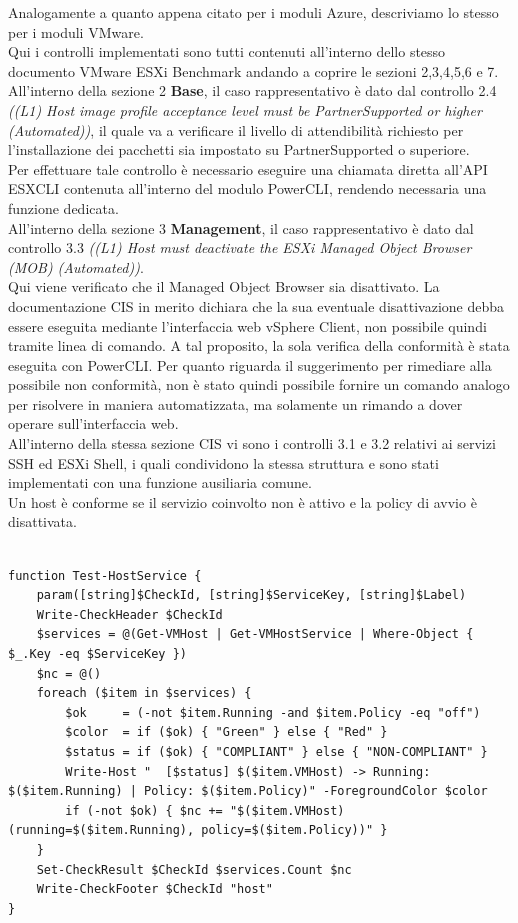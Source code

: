 \documentclass[a4paper,11pt]{report}
\begin{document}
Analogamente a quanto appena citato per i moduli Azure, descriviamo lo stesso per i moduli VMware. \\
Qui i controlli implementati sono tutti contenuti all'interno dello stesso documento VMware ESXi Benchmark \cite{CIS_VMware} andando a coprire le sezioni 2,3,4,5,6 e 7. \\

All'interno della sezione 2 \textbf{Base}, il caso rappresentativo è dato dal controllo 2.4 \textit{((L1) Host image profile acceptance level must be PartnerSupported or higher (Automated))}, il quale va a verificare il livello di attendibilità richiesto per l'installazione dei pacchetti sia impostato su PartnerSupported o superiore. \\
Per effettuare tale controllo è necessario eseguire una chiamata diretta all'API ESXCLI contenuta all'interno del modulo PowerCLI, rendendo necessaria una funzione dedicata. \\

All'interno della sezione 3 \textbf{Management}, il caso rappresentativo è dato dal controllo 3.3 \textit{((L1) Host must deactivate the ESXi Managed Object Browser (MOB) (Automated))}. \\
Qui viene verificato che il Managed Object Browser sia disattivato. La documentazione CIS in merito dichiara che la sua eventuale disattivazione debba essere eseguita mediante l'interfaccia web vSphere Client, non possibile quindi tramite linea di comando. A tal proposito, la sola verifica della conformità è stata eseguita con PowerCLI. Per quanto riguarda il suggerimento per rimediare alla possibile non conformità, non è stato quindi possibile fornire un comando analogo per risolvere in maniera automatizzata, ma solamente un rimando a dover operare sull'interfaccia web. \\
All'interno della stessa sezione CIS vi sono i controlli 3.1 e 3.2 relativi ai servizi SSH ed ESXi Shell, i quali condividono la stessa struttura e sono stati implementati con una funzione ausiliaria comune.\\
Un host è conforme se il servizio coinvolto non è attivo e la policy di avvio è disattivata.

\begin{lstlisting}[style=azcli, caption={Funzione \texttt{Test-HostService} per i controlli sui servizi critici degli host}, label={lst:host-service}]

function Test-HostService {
    param([string]$CheckId, [string]$ServiceKey, [string]$Label)
    Write-CheckHeader $CheckId
    $services = @(Get-VMHost | Get-VMHostService | Where-Object { $_.Key -eq $ServiceKey })
    $nc = @()
    foreach ($item in $services) {
        $ok     = (-not $item.Running -and $item.Policy -eq "off")
        $color  = if ($ok) { "Green" } else { "Red" }
        $status = if ($ok) { "COMPLIANT" } else { "NON-COMPLIANT" }
        Write-Host "  [$status] $($item.VMHost) -> Running: $($item.Running) | Policy: $($item.Policy)" -ForegroundColor $color
        if (-not $ok) { $nc += "$($item.VMHost) (running=$($item.Running), policy=$($item.Policy))" }
    }
    Set-CheckResult $CheckId $services.Count $nc
    Write-CheckFooter $CheckId "host"
}
\end{lstlisting}
\end{document}
